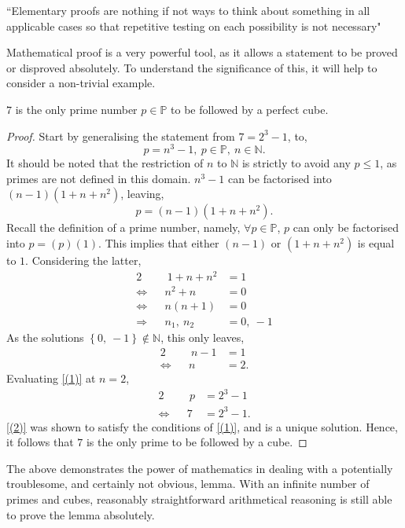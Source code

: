 \documentclass{article}
\begin{document}
``Elementary proofs are nothing if not ways to think about something in all applicable cases so that repetitive testing on each possibility is not necessary"

Mathematical proof is a very powerful tool, as it allows a statement to be proved or disproved absolutely. To understand the significance of this, it will help to consider a non-trivial example.
\begin{lemma} \label{Lemma 1}
    $7$ is the only prime number $p \in \mathbb{P}$ to be followed by a perfect cube.
\end{lemma}
\begin{proof}
    Start by generalising the statement from $7 = 2^3 - 1$, to,
    \begin{equation} \label{(1)}
        p = n^3 - 1,\ p\in\mathbb{P},\ n\in\mathbb{N}.     
    \end{equation}
    It should be noted that the restriction of $n$ to $\mathbb{N}$ is strictly to avoid any $p\leq1$, as primes are not defined in this domain. $n^3 - 1$ can be factorised into $\left(n-1\right) \left(1 + n + n^2 \right)$, leaving,
    \begin{equation*}
        p = \left(n-1\right) \left(1 + n + n^2 \right).
    \end{equation*}
    Recall the definition of a prime number, namely, $\forall p \in \mathbb{P}$, $p$ can only be factorised into $p=\left(p \right) \left(1 \right)$. This implies that either $\left(n-1\right)$ or $\left(1 + n + n^2 \right)$ is equal to $1$. Considering the latter,
    \begin{alignat*}{2}
        && \ 1 + n + n^2 &= 1 \\
        \Leftrightarrow&& n^2 + n &= 0 \\
        \Leftrightarrow&& n\left(n + 1\right) &= 0 \\
        \Rightarrow&& n_1,\ n_2 &= 0,\ -1
    \end{alignat*}
    As the solutions $\left\{0,\ -1\right\} \notin \mathbb{N}$, this only leaves,
    \begin{alignat}{2}
        && \ n - 1 &= 1 \nonumber \\
        \label{(2)} \Leftrightarrow&& n &= 2.
    \end{alignat}
    Evaluating \eqref{(1)} at $n=2$,
    \begin{alignat*}{2}
        && \ p &= 2^3 - 1 \\
        \Leftrightarrow&& 7 &= 2^3 - 1 \tag{as was postulated}.
    \end{alignat*}
    \eqref{(2)} was shown to satisfy the conditions of \eqref{(1)}, and is a unique solution. Hence, it follows that $7$ is the only prime to be followed by a cube.
\end{proof}
The above demonstrates the power of mathematics in dealing with a potentially troublesome, and certainly not obvious, lemma. With an infinite number of primes and cubes, reasonably straightforward arithmetical reasoning is still able to prove the lemma absolutely.
\end{document}
